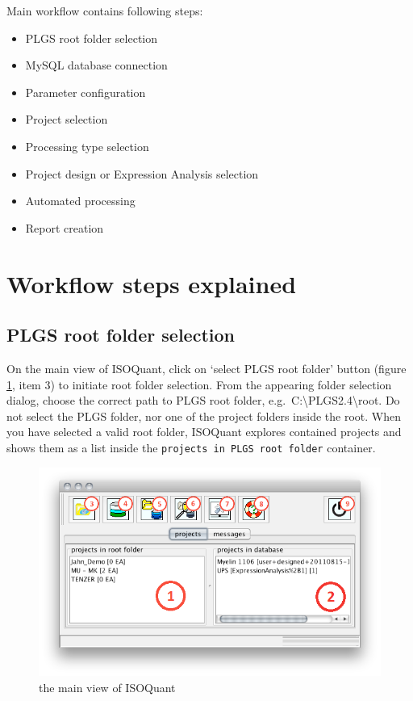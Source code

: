 \documentclass[]{article}
\makeatletter
\def\maxwidth{\ifdim\Gin@nat@width>\linewidth\linewidth
\else\Gin@nat@width\fi}
\let\Oldincludegraphics\includegraphics
\renewcommand{\includegraphics}[1]{\Oldincludegraphics[width=\maxwidth]{#1}}
\makeatother
\begin{document}
Main workflow contains following steps:

\begin{itemize}
\item
  PLGS root folder selection
\item
  MySQL database connection
\item
  Parameter configuration
\item
  Project selection
\item
  Processing type selection
\item
  Project design or Expression Analysis selection
\item
  Automated processing
\item
  Report creation
\end{itemize}

\section{Workflow steps explained}

\subsection{PLGS root folder selection}

On the main view of ISOQuant, click on `select PLGS root folder' button
(figure \ref{pic:GUI}, item 3) to initiate root folder selection. From
the appearing folder selection dialog, choose the correct path to PLGS
root folder, e.g.~C:\textbackslash{}PLGS2.4\textbackslash{}root. Do not
select the PLGS folder, nor one of the project folders inside the root.
When you have selected a valid root folder, ISOQuant explores contained
projects and shows them as a list inside the
\lstinline!projects in PLGS root folder! container.

\begin{figure}[htbp]
\centering
\includegraphics{assets/isoquant/pics/gui.png}
\caption{the main view of ISOQuant \label{pic:GUI}}
\end{figure}
\end{document}
